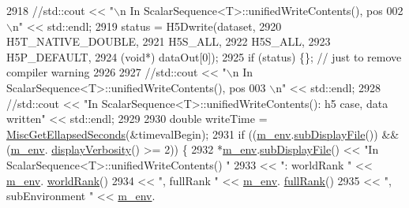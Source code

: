 \begin{DoxyCode}
2918               \textcolor{comment}{//std::cout << "\(\backslash\)n In ScalarSequence<T>::unifiedWriteContents(), pos 002 \(\backslash\)n" << std::endl;}
2919               status = H5Dwrite(dataset,
2920                                 H5T\_NATIVE\_DOUBLE,
2921                                 H5S\_ALL,
2922                                 H5S\_ALL,
2923                                 H5P\_DEFAULT,
2924                                 (\textcolor{keywordtype}{void}*) dataOut[0]);
2925               \textcolor{keywordflow}{if} (status) \{\}; \textcolor{comment}{// just to remove compiler warning}
2926 
2927               \textcolor{comment}{//std::cout << "\(\backslash\)n In ScalarSequence<T>::unifiedWriteContents(), pos 003 \(\backslash\)n" << std::endl;}
2928               \textcolor{comment}{//std::cout << "In ScalarSequence<T>::unifiedWriteContents(): h5 case, data written" <<
       std::endl;}
2929 
2930               \textcolor{keywordtype}{double} writeTime = \hyperlink{namespace_q_u_e_s_o_a424bc33f2e6e287fd468408d14b772ee}{MiscGetEllapsedSeconds}(&timevalBegin);
2931               \textcolor{keywordflow}{if} ((\hyperlink{class_q_u_e_s_o_1_1_scalar_sequence_a71618cd6351b29361b437af68447a4c8}{m\_env}.\hyperlink{class_q_u_e_s_o_1_1_base_environment_a8a0064746ae8dddfece4229b9ad374d6}{subDisplayFile}()) && (\hyperlink{class_q_u_e_s_o_1_1_scalar_sequence_a71618cd6351b29361b437af68447a4c8}{m\_env}.
      \hyperlink{class_q_u_e_s_o_1_1_base_environment_a1fe5f244fc0316a0ab3e37463f108b96}{displayVerbosity}() >= 2)) \{
2932                 *\hyperlink{class_q_u_e_s_o_1_1_scalar_sequence_a71618cd6351b29361b437af68447a4c8}{m\_env}.\hyperlink{class_q_u_e_s_o_1_1_base_environment_a8a0064746ae8dddfece4229b9ad374d6}{subDisplayFile}() << \textcolor{stringliteral}{"In ScalarSequence<T>::unifiedWriteContents()
      "}
2933                                         << \textcolor{stringliteral}{": worldRank "}      << \hyperlink{class_q_u_e_s_o_1_1_scalar_sequence_a71618cd6351b29361b437af68447a4c8}{m\_env}.
      \hyperlink{class_q_u_e_s_o_1_1_base_environment_a78b57112bbd0e6dd0e8afec00b40ffa7}{worldRank}()
2934                                         << \textcolor{stringliteral}{", fullRank "}       << \hyperlink{class_q_u_e_s_o_1_1_scalar_sequence_a71618cd6351b29361b437af68447a4c8}{m\_env}.
      \hyperlink{class_q_u_e_s_o_1_1_base_environment_a84a239e42ae443cf71db6e03e8159620}{fullRank}()
2935                                         << \textcolor{stringliteral}{", subEnvironment "} << \hyperlink{class_q_u_e_s_o_1_1_scalar_sequence_a71618cd6351b29361b437af68447a4c8}{m\_env}.

\end{DoxyCode}
